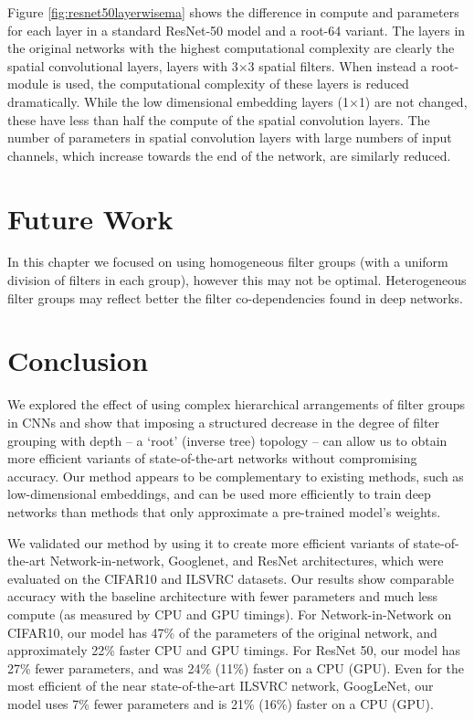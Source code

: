 \documentclass[thesis]{subfiles}
\begin{document}
	Figure \ref{fig:resnet50layerwisema} shows the difference in compute and parameters for each layer in a standard ResNet-50 model and a root-64 variant. The layers in the original networks with the highest computational complexity are clearly the spatial convolutional layers, \ie layers with 3$\times$3 spatial filters. When instead a root-module is used, the computational complexity of these layers is reduced dramatically. While the low dimensional embedding layers (1$\times$1) are not changed, these have less than half the compute of the spatial convolution layers. The number of parameters in spatial convolution layers with large numbers of input channels, which increase towards the end of the network, are similarly reduced.
	
	\section{Future Work} 
	In this chapter we focused on using homogeneous filter groups (with a uniform division of filters in each group), however this may not be optimal. Heterogeneous filter groups may reflect better the filter co-dependencies found in deep networks. %
	
	\section{Conclusion}
	We explored the effect of using complex hierarchical arrangements of filter groups in CNNs and show that imposing a structured decrease in the degree of filter grouping with depth -- a `root' (inverse tree) topology -- can allow us to obtain more efficient variants of state-of-the-art networks without compromising accuracy. Our method appears to be complementary to existing methods, such as low-dimensional embeddings, and can be used more efficiently to train deep networks than methods that only approximate a pre-trained model's weights.
	
	We validated our method by using it to create more efficient variants of state-of-the-art Network-in-network, Googlenet, and ResNet architectures, which were evaluated on the CIFAR10 and ILSVRC datasets. Our results show comparable accuracy with the baseline architecture with fewer parameters and much less compute (as measured by CPU and GPU timings). For Network-in-Network on CIFAR10, our model has 47\% of the parameters of the original network, and approximately 22\% faster CPU and GPU timings. For ResNet 50, our model has 27\% fewer parameters, and was 24\% (11\%) faster on a CPU (GPU). 
	Even for the most efficient of the near state-of-the-art ILSVRC network, GoogLeNet, our model uses 7\% fewer parameters and is 21\% (16\%) faster on a CPU (GPU).
	
	
\end{document}

